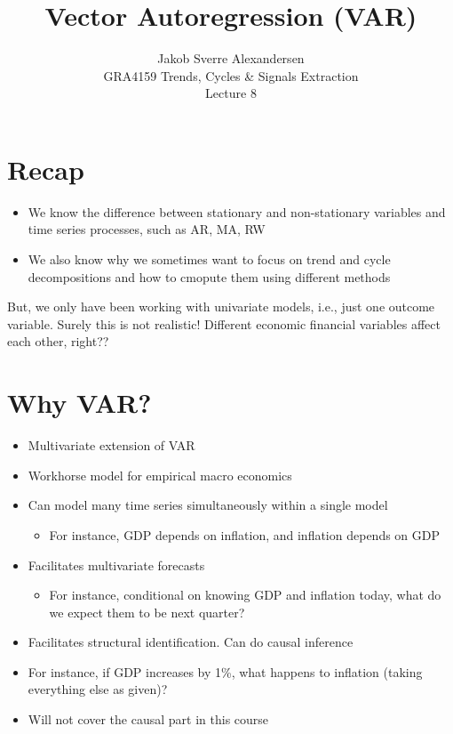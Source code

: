 \documentclass[10pt]{article}
\begin{document}
 
\title{Vector Autoregression (VAR)}
\author{Jakob Sverre Alexandersen\\
GRA4159 Trends, Cycles \& Signals Extraction\\
Lecture 8}
\maketitle

\tableofcontents
\newpage

\section{Recap}
\begin{itemize}
    \item We know the difference between stationary and non-stationary variables and time series processes, such as AR, MA, RW 
    \item We also know why we sometimes want to focus on trend and cycle decompositions and how to cmopute them using different methods 
\end{itemize}
But, we only have been working with univariate models, i.e., just one outcome variable. Surely this is not realistic! Different economic financial variables affect each other, right??

\section{Why VAR?}
\begin{itemize}
    \item Multivariate extension of VAR 
    \item Workhorse model for empirical macro economics 
    \item Can model many time series simultaneously within a single model 
    \begin{itemize}
        \item For instance, GDP depends on inflation, and inflation depends on GDP
    \end{itemize}
    \item Facilitates multivariate forecasts 
    \begin{itemize}
        \item For instance, conditional on knowing GDP and inflation today, what do we expect them to be next quarter?
    \end{itemize}
    \item Facilitates structural identification. Can do causal inference 
    \item For instance, if GDP increases by 1\%, what happens to inflation (taking everything else as given)?
    \item Will not cover the causal part in this course 
\end{itemize}
\end{document}
